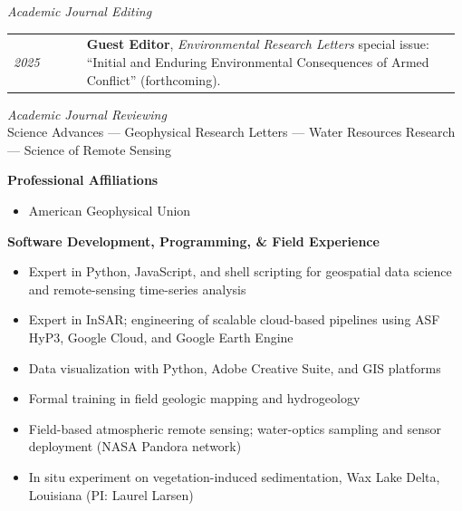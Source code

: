\documentclass[letterpaper,11pt,oneside]{article}
\newcommand{\datefmt}[1]{\textit{#1}}
\begin{document}
\begin{flushleft}\textit{Academic Journal Editing}\end{flushleft}
\vspace{-2ex}
\begin{longtable}{@{}p{0.16\linewidth}p{0.82\linewidth}@{}}
\datefmt{2025} & \textbf{Guest Editor}, \textit{Environmental Research Letters} special issue: “Initial and Enduring Environmental Consequences of Armed Conflict” (forthcoming).\\[1.0ex]
\end{longtable}
\vspace{-2ex}

\noindent\textit{Academic Journal Reviewing}\\
\vspace{2ex}
Science Advances — Geophysical Research Letters — Water Resources Research — Science of Remote Sensing

\begin{flushleft}\textbf{\Large{Professional Affiliations}}\end{flushleft}
\vspace{-2ex}
\begin{itemize}\setlength\itemsep{0.1em}
  \item American Geophysical Union
\end{itemize}
\vspace{-2ex}
\begin{flushleft}\textbf{\Large{Software Development, Programming, \& Field Experience}}\end{flushleft}
\vspace{-2ex}
\begin{itemize}\setlength\itemsep{0.1em}
  \item Expert in Python, JavaScript, and shell scripting for geospatial data science and remote-sensing time-series analysis
  \item Expert in InSAR; engineering of scalable cloud-based pipelines using ASF HyP3, Google Cloud, and Google Earth Engine
  \item Data visualization with Python, Adobe Creative Suite, and GIS platforms
  \item Formal training in field geologic mapping and hydrogeology
  \item Field-based atmospheric remote sensing; water-optics sampling and sensor deployment (NASA Pandora network)
  \item In situ experiment on vegetation-induced sedimentation, Wax Lake Delta, Louisiana (PI: Laurel Larsen)
\end{itemize}

\newpage
\end{document}
